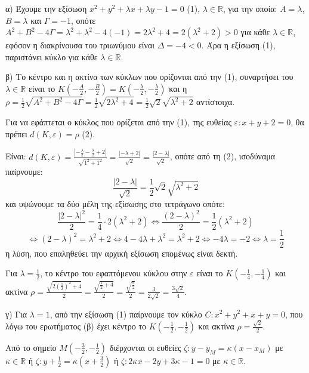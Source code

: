 \hfill\break
α) Έχουμε την εξίσωση $x^2 + y^2 + \lambda x + \lambda y - 1 = 0$ (1), $\lambda \in \mathbb{R}$, για την οποία:
$A = \lambda$, $B = \lambda$ και $\Gamma = -1$, οπότε $A^2 + B^2 - 4\Gamma = \lambda^2 + \lambda^2 - 4(-1) = 2\lambda^2 + 4 = 2(\lambda^2 + 2) > 0$ για κάθε $\lambda \in \mathbb{R}$, εφόσον η διακρίνουσα του τριωνύμου είναι $\Delta = -4 < 0$.
Άρα η εξίσωση (1), παριστάνει κύκλο για κάθε $\lambda \in \mathbb{R}$.

β) Το κέντρο και η ακτίνα των κύκλων που ορίζονται από την (1), συναρτήσει του $\lambda \in \mathbb{R}$
είναι το $K\left(-\frac{A}{2}, -\frac{B}{2}\right) = K\left(-\frac{\lambda}{2}, -\frac{\lambda}{2}\right)$ και η
$\rho = \frac{1}{2}\sqrt{A^2 + B^2 - 4\Gamma} = \frac{1}{2}\sqrt{2\lambda^2 + 4} = \frac{1}{2}\sqrt{2}\sqrt{\lambda^2 + 2}$ αντίστοιχα.

Για να εφάπτεται ο κύκλος που ορίζεται από την (1), της ευθείας $\varepsilon: x + y + 2 = 0$, θα πρέπει $d(K, \varepsilon) = \rho$ (2).

Είναι: $d(K, \varepsilon) = \frac{\left|-\frac{\lambda}{2} - \frac{\lambda}{2} + 2\right|}{\sqrt{1^2 + 1^2}} = \frac{|-\lambda + 2|}{\sqrt{2}} = \frac{|2 - \lambda|}{\sqrt{2}}$, οπότε από τη (2), ισοδύναμα παίρνουμε:
\[ \frac{|2 - \lambda|}{\sqrt{2}} = \frac{1}{2}\sqrt{2}\sqrt{\lambda^2 + 2} \]
και υψώνουμε τα δύο μέλη της εξίσωσης στο τετράγωνο οπότε:
\[ \frac{|2 - \lambda|^2}{2} = \frac{1}{4} \cdot 2 (\lambda^2 + 2) \Leftrightarrow \frac{(2 - \lambda)^2}{2} = \frac{1}{2} (\lambda^2 + 2) \]
\[ \Leftrightarrow (2 - \lambda)^2 = \lambda^2 + 2 \Leftrightarrow 4 - 4\lambda + \lambda^2 = \lambda^2 + 2 \Leftrightarrow -4\lambda = -2 \Leftrightarrow \lambda = \frac{1}{2} \]
η λύση, που επαληθεύει την αρχική εξίσωση επομένως είναι δεκτή.

Για $\lambda = \frac{1}{2}$, το κέντρο του εφαπτόμενου κύκλου στην $\varepsilon$ είναι το $K\left(-\frac{1}{4}, -\frac{1}{4}\right)$ και ακτίνα $\rho = \frac{\sqrt{2(\frac{1}{2})^2 + 4}}{2} = \frac{\sqrt{\frac{1}{2} + 4}}{2} = \frac{\sqrt{\frac{9}{2}}}{2} = \frac{3}{2\sqrt{2}} = \frac{3\sqrt{2}}{4}$.

γ) Για $\lambda = 1$, από την εξίσωση (1) παίρνουμε τον κύκλο $C: x^2 + y^2 + x + y = 0$, που λόγω του ερωτήματος (β) έχει κέντρο το $K\left(-\frac{1}{2}, -\frac{1}{2}\right)$ και ακτίνα $\rho = \frac{\sqrt{2}}{2}$.

Από το σημείο $M\left(-\frac{3}{2}, -\frac{1}{2}\right)$ διέρχονται οι ευθείες $\zeta: y - y_M = \kappa(x - x_M)$ με $\kappa \in \mathbb{R}$
ή $\zeta: y + \frac{1}{2} = \kappa\left(x + \frac{3}{2}\right)$ ή $\zeta: 2\kappa x - 2y + 3\kappa - 1 = 0$ με $\kappa \in \mathbb{R}$.

